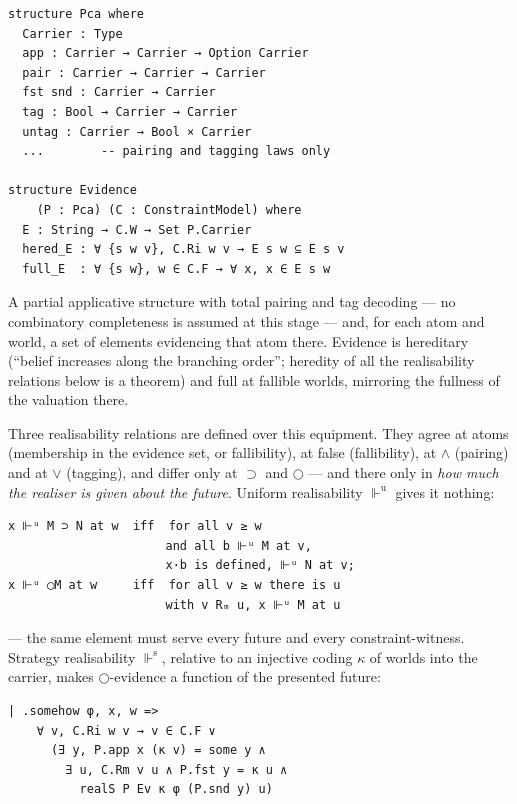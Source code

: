 \begin{lstlisting}
structure Pca where
  Carrier : Type
  app : Carrier → Carrier → Option Carrier
  pair : Carrier → Carrier → Carrier
  fst snd : Carrier → Carrier
  tag : Bool → Carrier → Carrier
  untag : Carrier → Bool × Carrier
  ...        -- pairing and tagging laws only

structure Evidence
    (P : Pca) (C : ConstraintModel) where
  E : String → C.W → Set P.Carrier
  hered_E : ∀ {s w v}, C.Ri w v → E s w ⊆ E s v
  full_E  : ∀ {s w}, w ∈ C.F → ∀ x, x ∈ E s w
\end{lstlisting}

A partial applicative structure with total pairing and tag decoding ---
no combinatory completeness is assumed at this stage --- and, for each
atom and world, a set of elements evidencing that atom there. Evidence
is hereditary (``belief increases along the branching order''; heredity
of all the realisability relations below is a theorem) and full at
fallible worlds, mirroring the fullness of the valuation there.

Three realisability relations are defined over this equipment. They
agree at atoms (membership in the evidence set, or fallibility), at
false (fallibility), at \ensuremath{\wedge} (pairing) and at \ensuremath{\vee} (tagging), and differ only
at \ensuremath{\supset} and \ensuremath{\bigcirc} --- and there only in \emph{how much the realiser is given about the
future}. Uniform realisability \ensuremath{\Vdash^{\mathrm{u}}} gives it nothing:

\begin{lstlisting}
x ⊩ᵘ M ⊃ N at w  iff  for all v ≥ w
                      and all b ⊩ᵘ M at v,
                      x·b is defined, ⊩ᵘ N at v;
x ⊩ᵘ ◯M at w     iff  for all v ≥ w there is u
                      with v Rₘ u, x ⊩ᵘ M at u
\end{lstlisting}

--- the same element must serve every future and every
constraint-witness. Strategy realisability \ensuremath{\Vdash^{\mathrm{s}}}, relative to an injective
coding \ensuremath{\kappa} of worlds into the carrier, makes \ensuremath{\bigcirc}-evidence a function of the
presented future:

\begin{lstlisting}
| .somehow φ, x, w =>
    ∀ v, C.Ri w v → v ∈ C.F ∨
      (∃ y, P.app x (κ v) = some y ∧
        ∃ u, C.Rm v u ∧ P.fst y = κ u ∧
          realS P Ev κ φ (P.snd y) u)
\end{lstlisting}

